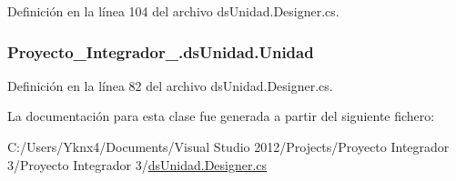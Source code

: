 Definición en la línea 104 del archivo ds\-Unidad.\-Designer.\-cs.

\hypertarget{class_proyecto___integrador__3_1_1ds_unidad_a78a56c4320f0067f020ea95490bdf195}{
\subsubsection[{Unidad}]{ Proyecto\-\_\-\-Integrador\-\_.\-ds\-Unidad.\-Unidad\hspace{0.3cm}{\ttfamily [get]}}}\label{class_proyecto___integrador__3_1_1ds_unidad_a78a56c4320f0067f020ea95490bdf195}


Definición en la línea 82 del archivo ds\-Unidad.\-Designer.\-cs.



La documentación para esta clase fue generada a partir del siguiente fichero\-:\begin{DoxyCompactItemize}
\item 
C\-:/\-Users/\-Yknx4/\-Documents/\-Visual Studio 2012/\-Projects/\-Proyecto Integrador 3/\-Proyecto Integrador 3/\hyperlink{ds_unidad_8_designer_8cs}{ds\-Unidad.\-Designer.\-cs}\end{DoxyCompactItemize}
